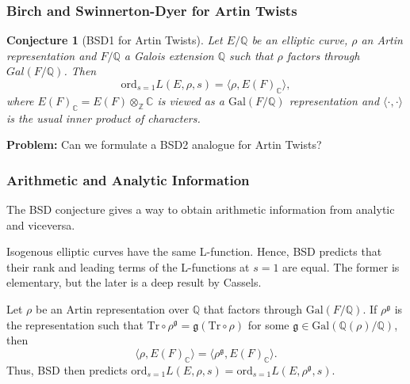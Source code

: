 \documentclass{beamer}
\newcommand{\Gal}{\mathrm{Gal}}
\newcommand{\Reg}{\mathrm{Reg}}
\newcommand{\ord}{\mathrm{ord}}
\newcommand{\tors}{\mathrm{tors}}
\newcommand{\BSD}{\mathrm{BSD}}
\newcommand{\Tr}{\mathrm{Tr}}
\newcommand{\CC}{\mathbb{C}}
\newcommand{\QQ}{\mathbb{Q}}
\newcommand{\ZZ}{\mathbb{Z}}
\theoremstyle{plain}
\newtheorem{conjecture}[thm]{Conjecture}
\begin{document}
\begin{frame}
    \frametitle{Birch and Swinnerton-Dyer for Artin Twists}
    \begin{conjecture}[BSD1 for Artin Twists]
        Let $E/\QQ$ be an elliptic curve, $\rho$ an Artin representation and $F/\QQ$ a Galois extension $\QQ$ such that $\rho$ factors through $Gal(F/\QQ)$. Then
        $$\ord_{s=1}L(E,\rho,s)=\langle\rho,E(F)_\CC\rangle,$$
        where $E(F)_\CC=E(F)\otimes_\ZZ \CC$ is viewed as a $\Gal(F/\QQ)$ representation and $\langle\cdot,\cdot\rangle$ is the usual inner product of characters.
    \end{conjecture}
    \textbf{Problem:} Can we formulate a BSD2 analogue for Artin Twists?
\end{frame}

\begin{frame}
    \frametitle{Arithmetic and Analytic Information}
    The BSD conjecture gives a way to obtain arithmetic information from analytic and viceversa.
    \begin{example}
        Isogenous elliptic curves have the same L-function. Hence, BSD predicts that their rank and leading terms of the L-functions at $s=1$ are equal. The former is elementary, but the later is a deep result by Cassels.
    \end{example}
    \begin{example}
        Let $\rho$ be an Artin representation over $\QQ$ that factors through $\Gal(F/\QQ)$. If $\rho^\mathfrak{g}$ is the representation such that $\Tr\circ \rho^\mathfrak{g}=\mathfrak{g}(\Tr\circ\rho)$ for some $\mathfrak{g}\in\Gal(\QQ(\rho)/\QQ)$, then $$\langle\rho,E(F)_\CC\rangle=\langle\rho^\mathfrak{g},E(F)_\CC\rangle.$$
        Thus, BSD then predicts $\ord_{s=1}L(E,\rho,s)=\ord_{s=1}L(E,\rho^\mathfrak{g},s)$.
    \end{example}
\end{frame}
\end{document}

